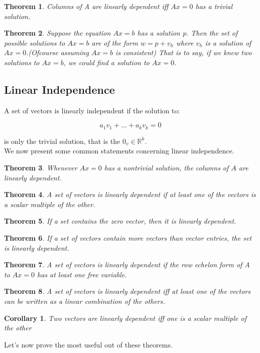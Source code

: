\documentclass{article}
\newtheorem{thm}{Theorem}[subsection]
\newtheorem{cor}{Corollary}[subsection]
\begin{document}
\begin{thm}
Columns of A are linearly dependent iff $Ax=0$ has a trivial solution.
\end{thm}

\begin{thm}
Suppose the equation $Ax=b$ has a solution p. Then the set of possible solutions to $Ax=b$ are of the form $w = p + v_{h}$ where $v_{h}$ is a solution of $Ax = 0$.(Ofcourse assuming $Ax=b$ is consistent) That is to say, if we knew two solutions to $Ax=b$, we could find a solution to $Ax=0$. 
\end{thm}


\subsection{Linear Independence}
A set of vectors is linearly independent if the solution to:

\begin{equation*}
    a_{1}v_{1} + \ldots + a_{k}v_{k} = 0
\end{equation*}

is only the trivial solution, that is the $0_{v} \in \mathbb{R}^{k}$.
\\
We now present some common statements concerning linear independence. 
\begin{tcolorbox}
  \begin{thm}
    Whenever $Ax=0$ has a nontrivial solution, the columns of $A$ are linearly dependent. 
    \end{thm}
    
    \begin{thm}
    A set of vectors is linearly dependent if at least one of the vectors is a scalar multiple of the other.
    \end{thm}
    
    \begin{thm}
    If a set contains the zero vector, then it is linearly dependent.
    \end{thm}
    
    \begin{thm}
    If a set of vectors contain more vectors than vector entries, the set is linearly dependent.
    \end{thm}
    
    \begin{thm}
    A set of vectors is linearly dependent if the row echelon form of A to $Ax=0$ has at least one free variable.
    \end{thm}
    
\begin{thm}
\label{comb}
A set of vectors is linearly dependent iff at least one of the vectors can be written as a linear combination of the others.
\end{thm}

\begin{cor}
Two vectors are linearly dependent iff one is a scalar multiple of the other
\end{cor}

\end{tcolorbox}
Let's now prove the most useful out of these theorems. 
\end{document}

